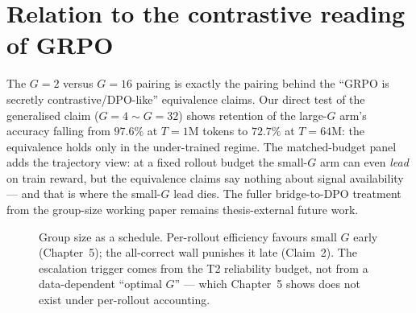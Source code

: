 \section{Relation to the contrastive reading of GRPO}
The $G{=}2$ versus $G{=}16$ pairing is exactly the pairing behind the
``GRPO is secretly contrastive/DPO-like'' equivalence claims. Our direct test
of the generalised claim ($G{=}4\sim G{=}32$) shows retention of the large-$G$
arm's accuracy falling from $97.6\%$ at $T{=}1$M tokens to $72.7\%$ at
$T{=}64$M: the equivalence holds only in the under-trained regime. The
matched-budget panel adds the trajectory view: at a fixed rollout budget the
small-$G$ arm can even \emph{lead} on train reward, but the equivalence
claims say nothing about signal availability --- and that is where the
small-$G$ lead dies. The fuller
bridge-to-DPO treatment from the group-size working paper remains
thesis-external future work.

\begin{figure}[t]
\centering
{}
\caption{Group size as a schedule. Per-rollout efficiency favours small $G$
early (Chapter~5); the all-correct wall punishes it late (Claim~2). The
escalation trigger comes from the T2 reliability budget, not from a
data-dependent ``optimal $G$'' --- which Chapter~5 shows does not exist under
per-rollout accounting.}
\label{fig:schedule}
\end{figure}

